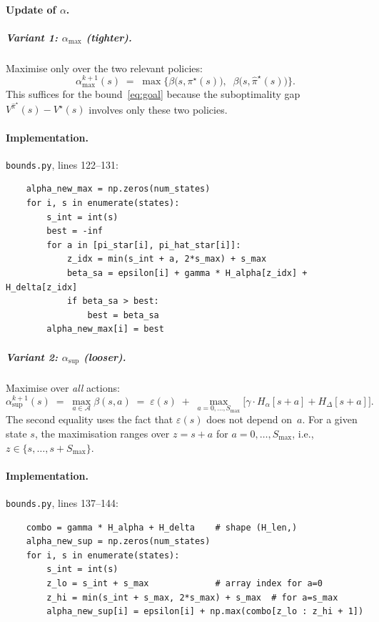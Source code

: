 \documentclass[11pt]{article}
\newcommand{\Smax}{S_{\max}}
\newcommand{\pistar}{\pi^\star}
\newcommand{\pihatstar}{\hat\pi^\star}
\newcommand{\Vstar}{V^\star}
\newcommand{\Vpihat}{V^{\pihatstar}}
\begin{document}
\paragraph{Update of $\alpha$.}

\subparagraph{Variant 1: $\alpha_{\max}$ (tighter).}
Maximise only over the two relevant policies:
\begin{equation}\label{eq:alpha-max}
  \alpha^{k+1}_{\max}(s)
  \;=\; \max\!\Big\{
    \beta\bigl(s,  \pistar(s)\bigr),\;\;
    \beta\bigl(s,  \pihatstar(s)\bigr)
  \Big\}.
\end{equation}
This suffices for the bound~\eqref{eq:goal} because the suboptimality gap
$\Vpihat(s) - \Vstar(s)$ involves only these two policies.

\paragraph{Implementation.}
\texttt{bounds.py}, lines 122--131:
\begin{verbatim}
    alpha_new_max = np.zeros(num_states)
    for i, s in enumerate(states):
        s_int = int(s)
        best = -inf
        for a in [pi_star[i], pi_hat_star[i]]:
            z_idx = min(s_int + a, 2*s_max) + s_max
            beta_sa = epsilon[i] + gamma * H_alpha[z_idx] + H_delta[z_idx]
            if beta_sa > best:
                best = beta_sa
        alpha_new_max[i] = best
\end{verbatim}

\subparagraph{Variant 2: $\alpha_{\sup}$ (looser).}
Maximise over \emph{all} actions:
\begin{equation}\label{eq:alpha-sup}
  \alpha^{k+1}_{\sup}(s)
  \;=\; \max_{a \in \mathcal{A}}  \beta(s, a)
  \;=\; \varepsilon(s)
  \;+\; \max_{a = 0, \ldots, \Smax}
        \bigl[\gamma \cdot H_\alpha[s+a] + H_\Delta[s+a]\bigr].
\end{equation}
The second equality uses the fact that $\varepsilon(s)$ does not depend on~$a$.
For a given state $s$, the maximisation ranges over $z = s + a$ for
$a = 0, \ldots, \Smax$, i.e., $z \in \{s, \ldots, s + \Smax\}$.

\paragraph{Implementation.}
\texttt{bounds.py}, lines 137--144:
\begin{verbatim}
    combo = gamma * H_alpha + H_delta    # shape (H_len,)
    alpha_new_sup = np.zeros(num_states)
    for i, s in enumerate(states):
        s_int = int(s)
        z_lo = s_int + s_max             # array index for a=0
        z_hi = min(s_int + s_max, 2*s_max) + s_max  # for a=s_max
        alpha_new_sup[i] = epsilon[i] + np.max(combo[z_lo : z_hi + 1])
\end{verbatim}
\end{document}
